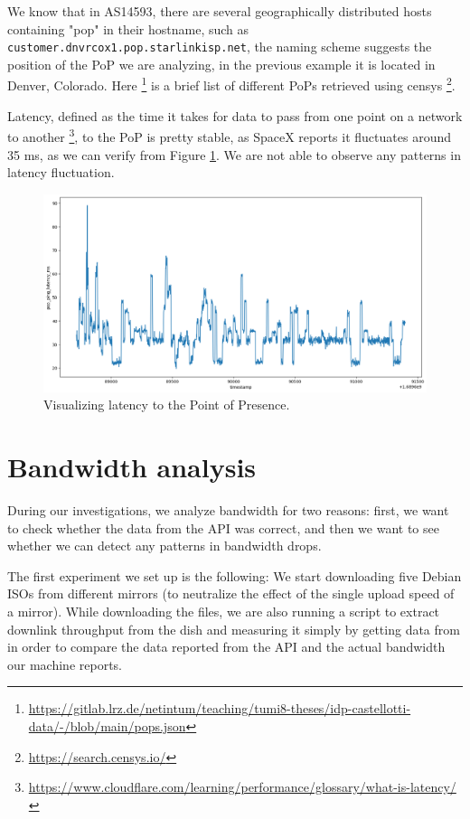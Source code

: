 \documentclass[IN,11pt,twoside,openright,idp,english]{tumthesis}
\begin{document}
We know that in AS14593, there are several geographically distributed hosts containing "pop" in their hostname, such as \texttt{customer.dnvrcox1.pop.starlinkisp.net}, the naming scheme suggests the position of the PoP we are analyzing, in the previous example it is located in Denver, Colorado. Here \footnote{\url{https://gitlab.lrz.de/netintum/teaching/tumi8-theses/idp-castellotti-data/-/blob/main/pops.json}} is a brief list of different PoPs retrieved using censys \footnote{\url{https://search.censys.io/}}.

Latency, defined as the time it takes for data to pass from one point on a network to another \footnote{\url{https://www.cloudflare.com/learning/performance/glossary/what-is-latency/}}, to the PoP is pretty stable, as SpaceX reports it fluctuates around 35 ms, as we can verify from Figure \ref{fig:vis-latency}. We are not able to observe any patterns in latency fluctuation.

\begin{figure}
    \centering
    \includegraphics[width=1\columnwidth]{img/latency.png}
    \caption{Visualizing latency to the Point of Presence.}
    \label{fig:vis-latency}
\end{figure}

\section{Bandwidth analysis}

During our investigations, we analyze bandwidth for two reasons: first, we want to check whether the data from the API was correct, and then we want to see whether we can detect any patterns in bandwidth drops.

The first experiment we set up is the following: We start downloading five Debian ISOs from different mirrors (to neutralize the effect of the single upload speed of a mirror). While downloading the files, we are also running a script to extract downlink throughput from the dish and measuring it simply by getting data from  in order to compare the data reported from the API and the actual bandwidth our machine reports.
\end{document}
